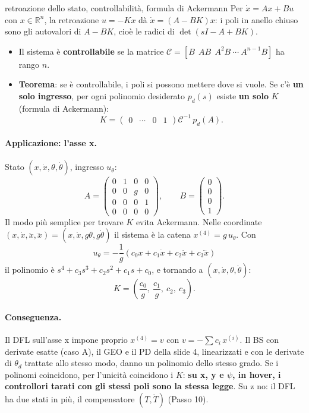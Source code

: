 \documentclass[11pt,a4paper]{article}
\begin{document}
\begin{teoria}{retroazione dello stato, controllabilità, formula di Ackermann}
Per $\dot x = Ax + Bu$ con $x \in \mathbb{R}^n$, la retroazione $u = -Kx$ dà $\dot x = (A - BK)x$: i poli in anello chiuso sono gli autovalori di $A - BK$, cioè le radici di $\det(sI - A + BK)$.
\begin{itemize}
  \item Il sistema è \textbf{controllabile} se la matrice $\mathcal{C} = [B\ \ AB\ \ A^2B\ \cdots\ A^{n-1}B]$ ha rango $n$.
  \item \textbf{Teorema}: se è controllabile, i poli si possono mettere dove si vuole. Se c'è \textbf{un solo ingresso}, per ogni polinomio desiderato $p_d(s)$ esiste \textbf{un solo} $K$ (formula di Ackermann):
  \[
  K = \begin{pmatrix} 0 & \cdots & 0 & 1 \end{pmatrix}\mathcal{C}^{-1}\, p_d(A).
  \]
\end{itemize}
\end{teoria}

\paragraph{Applicazione: l'asse x.} Stato $(x, \dot x, \theta, \dot\theta)$, ingresso $u_\theta$:
\[
A = \begin{pmatrix} 0&1&0&0 \\ 0&0&g&0 \\ 0&0&0&1 \\ 0&0&0&0 \end{pmatrix}, \qquad
B = \begin{pmatrix} 0\\0\\0\\1 \end{pmatrix}.
\]
Il modo più semplice per trovare $K$ evita Ackermann. Nelle coordinate $(x, \dot x, \ddot x, \dddot x) = (x, \dot x, g\theta, g\dot\theta)$ il sistema è la catena $x^{(4)} = g\,u_\theta$. Con
\[
u_\theta = -\frac{1}{g}\left(c_0 x + c_1\dot x + c_2\ddot x + c_3\dddot x\right)
\]
il polinomio è $s^4 + c_3 s^3 + c_2 s^2 + c_1 s + c_0$, e tornando a $(x, \dot x, \theta, \dot\theta)$:
\[
K = \left(\frac{c_0}{g},\ \frac{c_1}{g},\ c_2,\ c_3\right).
\]

\paragraph{Conseguenza.} Il DFL sull'asse x impone proprio $x^{(4)} = v$ con $v = -\sum c_i\,x^{(i)}$. Il BS con derivate esatte (caso A), il GEO e il PD della slide 4, linearizzati e con le derivate di $\theta_d$ trattate allo stesso modo, danno un polinomio dello stesso grado. Se i polinomi coincidono, per l'unicità coincidono i $K$: \textbf{su x, y e $\psi$, in hover, i controllori tarati con gli stessi poli sono la stessa legge}. Su z no: il DFL ha due stati in più, il compensatore $(T, \dot T)$ (Passo 10).
\end{document}
